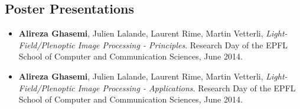 \documentclass[a4paper]{article}
\theoremstyle{definition}
\begin{document}
\subsection{Poster Presentations}
\begin{itemize}
	\item \textbf{Alireza Ghasemi}, Julien Lalande, Laurent Rime, Martin Vetterli, \textit{Light-Field/Plenoptic Image Processing - Principles}.  Research Day of the EPFL School of Computer and Communication Sciences, June 2014. %
	\item \textbf{Alireza Ghasemi}, Julien Lalande, Laurent Rime, Martin Vetterli, \textit{Light-Field/Plenoptic Image Processing - Applications}.  Research Day of the EPFL School of Computer and Communication Sciences, June 2014. %
\end{itemize}

%
\end{document}
